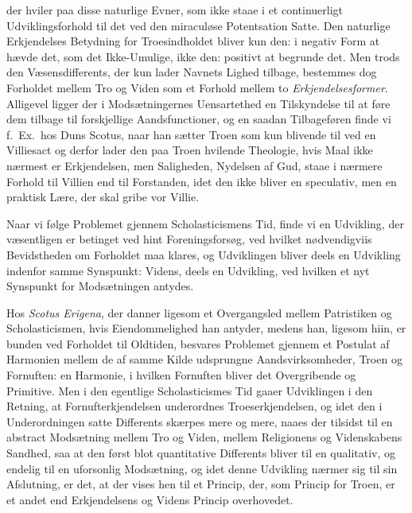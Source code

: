 \documentclass[12pt,a4paper]{book}
\newcommand{\opage}[1]{\marginnote{\footnotesize\textit{[#1]}}}
\begin{document}
der hviler paa disse naturlige Evner, som ikke staae i et continuerligt
Udviklingsforhold til det ved den miraculøse Potentsation Satte. Den naturlige
Erkjendelses Betydning for Troesindholdet bliver kun den: i negativ Form at hævde
det, som det Ikke-Umulige, ikke den: positivt at begrunde det. Men trods den
Væsensdifferents, der kun lader Navnets Lighed tilbage, bestemmes dog Forholdet
mellem Tro og Viden som et Forhold mellem to \emph{Erkjendelsesformer}. Alligevel ligger
der i Modsætningernes Uensartethed en Tilskyndelse til at føre dem tilbage til
forskjellige Aandsfunctioner, og en saadan Tilbageføren finde vi f.\ Ex.\ hos
Duns Scotus, naar han sætter Troen som kun blivende til ved en Villiesact og
derfor lader den paa Troen hvilende Theologie, hvis Maal ikke nærmest er
Erkjendelsen, men Saligheden, Nydelsen af Gud, staae i nærmere Forhold til Villien
end til Forstanden, idet den ikke bliver en speculativ, men en praktisk Lære, der
skal gribe vor Villie.

Naar vi følge Problemet gjennem Scholasticismens Tid, finde vi en Udvikling, der
væsentligen er betinget ved hint Foreningsforsøg, ved hvilket nødvendigviis
Bevidstheden om \opage{20}Forholdet maa klares, og Udviklingen bliver deels en Udvikling
indenfor samme Synspunkt: Videns, deels en Udvikling, ved hvilken et nyt
Synspunkt for Modsætningen antydes.

Hos \emph{Scotus Erigena}, der danner ligesom et Overgangsled mellem Patristiken og
Scholasticismen, hvis Eiendommelighed han antyder, medens han, ligesom hiin, er bunden ved Forholdet til Oldtiden, besvares Problemet gjennem et Postulat af
Harmonien mellem de af samme Kilde udsprungne Aandsvirksomheder, Troen og Fornuften: en Harmonie, i hvilken Fornuften bliver det Overgribende og Primitive.
Men i den egentlige Scholasticismes Tid gaaer Udviklingen i den Retning, at
Fornufterkjendelsen underordnes Troeserkjendelsen, og idet den i Underordningen
satte Differents skærpes mere og mere, naaes der tilsidst til en abstract
Modsætning mellem Tro og Viden, mellem Religionens og Videnskabens Sandhed, saa at
den først blot quantitative Differents bliver til en qualitativ, og endelig til en
uforsonlig Modsætning, og idet denne Udvikling nærmer sig til sin Afslutning, er
det, at der vises hen til et Princip, der, som Princip for Troen, er et andet end
Erkjendelsens og Videns Princip overhovedet.
\end{document}
